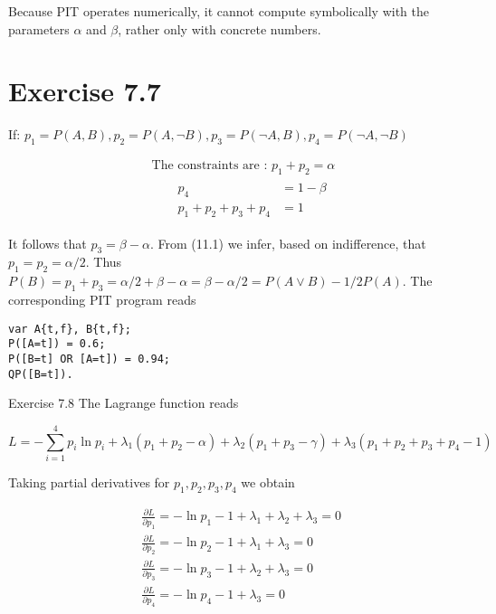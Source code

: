 \documentclass[10pt]{article}
\begin{document}
Because PIT operates numerically, it cannot compute symbolically with the parameters $\alpha$ and $\beta$, rather only with concrete numbers.

\section*{Exercise 7.7}
If: $p_{1}=P(A, B), p_{2}=P(A, \neg B), p_{3}=P(\neg A, B), p_{4}=P(\neg A, \neg B)$


\begin{align*}
& \text { The constraints are : } p_{1}+p_{2}=\alpha  \tag{11.1}\\
& \qquad \begin{aligned}
p_{4} & =1-\beta \\
p_{1}+p_{2}+p_{3}+p_{4} & =1
\end{aligned} \tag{11.2}
\end{align*}


It follows that $p_{3}=\beta-\alpha$. From (11.1) we infer, based on indifference, that $p_{1}=p_{2}=\alpha / 2$. Thus $P(B)=p_{1}+p_{3}=\alpha / 2+\beta-\alpha=\beta-\alpha / 2=P(A \vee B)-1 / 2 P(A)$. The corresponding PIT program reads

\begin{verbatim}
var A{t,f}, B{t,f};
P([A=t]) = 0.6;
P([B=t] OR [A=t]) = 0.94;
QP([B=t]).
\end{verbatim}

Exercise 7.8 The Lagrange function reads


\begin{equation*}
L=-\sum_{i=1}^{4} p_{i} \ln p_{i}+\lambda_{1}\left(p_{1}+p_{2}-\alpha\right)+\lambda_{2}\left(p_{1}+p_{3}-\gamma\right)+\lambda_{3}\left(p_{1}+p_{2}+p_{3}+p_{4}-1\right) \tag{11.4}
\end{equation*}


Taking partial derivatives for $p_{1}, p_{2}, p_{3}, p_{4}$ we obtain


\begin{align*}
& \frac{\partial L}{\partial p_{1}}=-\ln p_{1}-1+\lambda_{1}+\lambda_{2}+\lambda_{3}=0  \tag{11.5}\\
& \frac{\partial L}{\partial p_{2}}=-\ln p_{2}-1+\lambda_{1}+\lambda_{3}=0  \tag{11.6}\\
& \frac{\partial L}{\partial p_{3}}=-\ln p_{3}-1+\lambda_{2}+\lambda_{3}=0  \tag{11.7}\\
& \frac{\partial L}{\partial p_{4}}=-\ln p_{4}-1+\lambda_{3}=0 \tag{11.8}
\end{align*}
\end{document}

